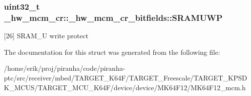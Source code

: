 \subsubsection[{\texorpdfstring{S\+R\+A\+M\+U\+WP}{SRAMUWP}}]{\setlength{\rightskip}{0pt plus 5cm}uint32\+\_\+t \+\_\+hw\+\_\+mcm\+\_\+cr\+::\+\_\+hw\+\_\+mcm\+\_\+cr\+\_\+bitfields\+::\+S\+R\+A\+M\+U\+WP}\hypertarget{struct__hw__mcm__cr_1_1__hw__mcm__cr__bitfields_a95572a8cec506ff6be027299a5f1ac77}{}\label{struct__hw__mcm__cr_1_1__hw__mcm__cr__bitfields_a95572a8cec506ff6be027299a5f1ac77}
\mbox{[}26\mbox{]} S\+R\+A\+M\+\_\+U write protect 

The documentation for this struct was generated from the following file\+:\begin{DoxyCompactItemize}
\item 
/home/erik/proj/piranha/code/piranha-\/ptc/src/receiver/mbed/\+T\+A\+R\+G\+E\+T\+\_\+\+K64\+F/\+T\+A\+R\+G\+E\+T\+\_\+\+Freescale/\+T\+A\+R\+G\+E\+T\+\_\+\+K\+P\+S\+D\+K\+\_\+\+M\+C\+U\+S/\+T\+A\+R\+G\+E\+T\+\_\+\+M\+C\+U\+\_\+\+K64\+F/device/device/\+M\+K64\+F12/M\+K64\+F12\+\_\+mcm.\+h\end{DoxyCompactItemize}
